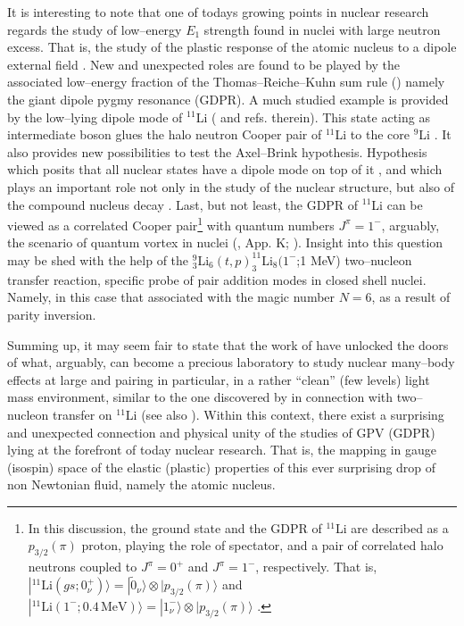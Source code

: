 \documentclass[a4paper,11pt]{article}
\numberwithin{equation}{section}
\numberwithin{figure}{section}
\numberwithin{table}{section}
\newcommand{\ket}[1]{|{#1} \rangle }
\begin{document}
It is interesting to note that one of todays growing points in nuclear research regards the study of low--energy $E_1$ strength found in nuclei with large neutron excess. That is, the study of the plastic response of the atomic nucleus to a dipole external field \cite{Savran:13}. New and unexpected roles are found to be played by the associated low--energy fraction of the Thomas--Reiche--Kuhn sum rule (\cite{Reiche:25,Kuhn:25}) namely  the giant dipole pygmy resonance (GDPR). A much studied example is provided by the low--lying dipole mode of $^{11}$Li (\cite{Kanungo:15} and refs. therein). This state acting as intermediate boson glues the halo neutron Cooper pair of $^{11}$Li to the core $^9$Li \cite{Barranco:01,Potel:10}. It also provides  new possibilities to test the Axel--Brink hypothesis. Hypothesis which posits that all nuclear states have a dipole mode on top of it \cite{Brink:55,Axel:67}, and which plays an important role not only in the study of the nuclear structure, but also of the compound nucleus decay \cite{Bertsch:86,Bortignon:98}. Last, but not least, the GDPR of $^{11}$Li can be viewed as a correlated Cooper pair\footnote{In this discussion, the ground state and the  GDPR of $^{11}$Li are described as a $p_{3/2}(\pi)$ proton, playing the role of spectator, and a pair of correlated halo neutrons coupled to $J^{\pi}=0^+$ and $J^{\pi}=1^-$, respectively. That is, $\ket{^{11}\text{Li}(gs;0^+_\nu)}=\ket{\tilde 0_{\nu}}\otimes\ket{p_{3/2}(\pi)}$ and $\ket{^{11}\text{Li}(1^-;0.4\,\text{MeV})}=\ket{1^-_\nu}\otimes\ket{p_{3/2}(\pi)}$ \cite{Barranco:01}.} with quantum numbers $J^{\pi}=1^-$, arguably, the scenario of  quantum vortex in nuclei (\cite{Bertsch:88,Brink:05}, App. K; \cite{Avogadro:07}). Insight into this question may be shed with the help of the $^9_3$Li$_6(t,p)^{11}_3$Li$_8(1^-$;1 MeV) two--nucleon transfer reaction, specific probe of pair addition modes in closed shell nuclei. Namely, in this case that associated with the magic number $N=6$, as a result of parity inversion.



 Summing up, it may seem fair to state that the work of \cite{Cappuzzello:15} have unlocked the doors of what, arguably, can become a precious laboratory to study nuclear many--body effects at large and pairing in particular, in a rather ``clean'' (few levels) light mass environment, similar to the one discovered by \cite{Tanihata:08} in connection with two--nucleon transfer on $^{11}$Li (see also \cite{Tanihata:13}). Within this context,  there exist a surprising and unexpected connection and physical unity of the studies of GPV (GDPR) lying at the forefront of today nuclear research. That is, the mapping in gauge  (isospin) space of the	 elastic (plastic) properties of this ever surprising drop of non Newtonian fluid, namely the atomic nucleus. 
 
\end{document}
